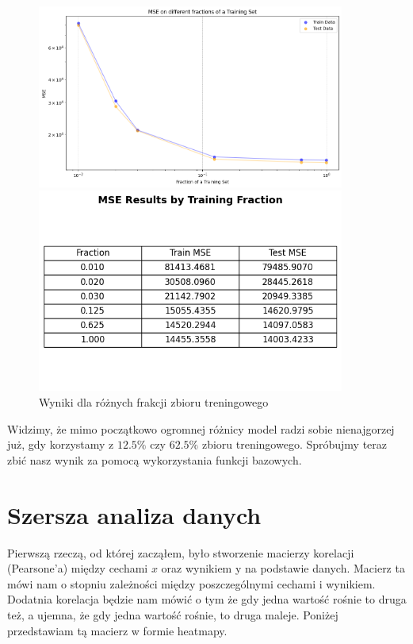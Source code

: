 \documentclass[polish,12pt,a4paper]{extarticle}
\begin{document}
\begin{figure}[h!]
    \centering
    \begin{minipage}[b]{0.48\textwidth}
    \includegraphics[width=0.9\textwidth]{data/fracgraph.png}
    \caption{Wyniki dla różnych frakcji zbioru treningowego}
    \end{minipage}
     \hspace{0.02\textwidth}
    \begin{minipage}[b]{0.48\textwidth}
    \includegraphics[width=0.9\textwidth]{data/fractable.png}
    \end{minipage}
\end{figure}
\FloatBarrier

Widzimy, że mimo początkowo ogromnej różnicy model radzi sobie nienajgorzej już, gdy korzystamy z $12.5 \% $ czy $62.5 \%$ zbioru treningowego. Spróbujmy teraz zbić nasz wynik za pomocą wykorzystania funkcji bazowych.

\section*{Szersza analiza danych}
Pierwszą rzeczą, od której zacząłem, było stworzenie macierzy korelacji (Pearsone'a) między cechami $x$ oraz wynikiem y na podstawie danych. Macierz ta mówi nam o stopniu zależności między poszczególnymi cechami i wynikiem. Dodatnia korelacja będzie nam mówić o tym że gdy jedna wartość rośnie to druga też, a ujemna, że gdy jedna wartość rośnie, to druga maleje. Poniżej przedstawiam tą macierz w formie heatmapy.
\end{document}
